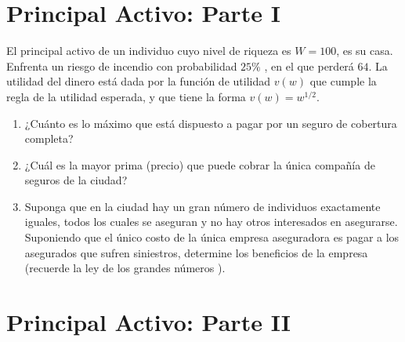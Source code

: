 \documentclass{exam}
\begin{document}
\section{Principal Activo: Parte I}

El principal activo de un individuo cuyo nivel de riqueza es $W = 100$, es su casa. Enfrenta un riesgo de incendio con probabilidad $25\%$ , en el que perderá $64$. La utilidad del dinero está dada por la función de utilidad $v(w)$ que cumple la regla de la utilidad esperada, y que tiene la forma $v(w) = w^{1/2} $.

\begin{enumerate}

\item  ¿Cuánto es lo máximo que está dispuesto a pagar por un seguro de cobertura completa?

\item ¿Cuál es la mayor prima (precio) que puede cobrar la única compañía de seguros de la ciudad?

\item Suponga que en la ciudad hay un gran número de individuos exactamente iguales, todos los cuales se aseguran y no hay otros interesados en asegurarse. Suponiendo que el único costo de la única empresa aseguradora es pagar a los asegurados que sufren siniestros, determine los beneficios de la empresa (recuerde la ley de los grandes números ).
\end{enumerate}

\section{Principal Activo: Parte II}
\end{document}
